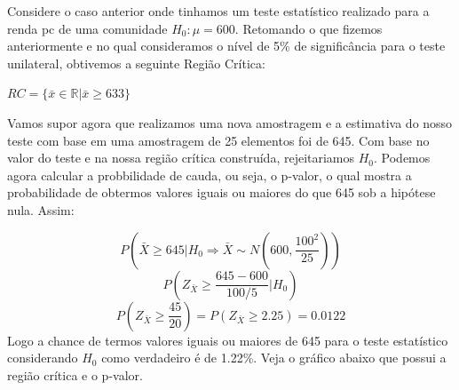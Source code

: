 \documentclass[
  letterpaper,
  DIV=11,
  numbers=noendperiod]{scrartcl}
\begin{document}
Considere o caso anterior onde tinhamos um teste estatístico realizado
para a renda pc de uma comunidade \(H_0: \mu=600\). Retomando o que
fizemos anteriormente e no qual consideramos o nível de 5\% de
significância para o teste unilateral, obtivemos a seguinte Região
Crítica:

\(RC =\{\bar{x} \in \mathbb{R} | \bar{x} \geq 633\}\)

Vamos supor agora que realizamos uma nova amostragem e a estimativa do
nosso teste com base em uma amostragem de 25 elementos foi de 645. Com
base no valor do teste e na nossa região crítica construída,
rejeitariamos \(H_0\). Podemos agora calcular a probbilidade de cauda,
ou seja, o p-valor, o qual mostra a probabilidade de obtermos valores
iguais ou maiores do que 645 sob a hipótese nula. Assim:

\[P(\bar{X}\geq 645|H_0 \Rightarrow \bar{X} \sim N(600,\frac{100^2}{25}))\]
\[P(Z_{\bar{X}}\geq \frac{645-600}{100/5}|H_0)\]
\[P(Z_{\bar{X}} \geq  \frac{45}{20})=P(Z_{\bar{X}} \geq 2.25)=0.0122\]
Logo a chance de termos valores iguais ou maiores de 645 para o teste
estatístico considerando \(H_0\) como verdadeiro é de 1.22\%. Veja o
gráfico abaixo que possui a região crítica e o p-valor.
\end{document}
